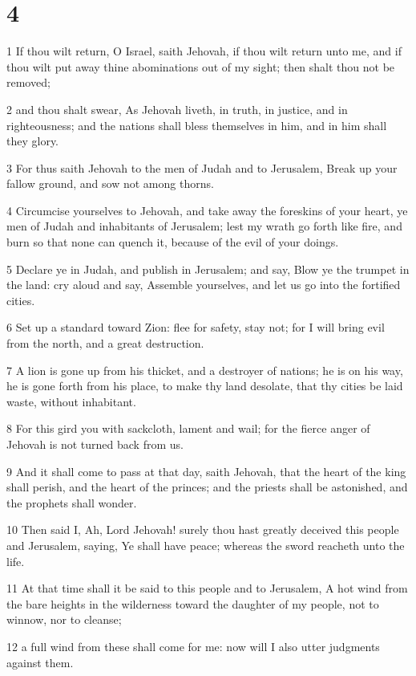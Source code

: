 \chapter{4}

\par 1 If thou wilt return, O Israel, saith Jehovah, if thou wilt return unto me, and if thou wilt put away thine abominations out of my sight; then shalt thou not be removed;
\par 2 and thou shalt swear, As Jehovah liveth, in truth, in justice, and in righteousness; and the nations shall bless themselves in him, and in him shall they glory.
\par 3 For thus saith Jehovah to the men of Judah and to Jerusalem, Break up your fallow ground, and sow not among thorns.
\par 4 Circumcise yourselves to Jehovah, and take away the foreskins of your heart, ye men of Judah and inhabitants of Jerusalem; lest my wrath go forth like fire, and burn so that none can quench it, because of the evil of your doings.
\par 5 Declare ye in Judah, and publish in Jerusalem; and say, Blow ye the trumpet in the land: cry aloud and say, Assemble yourselves, and let us go into the fortified cities.
\par 6 Set up a standard toward Zion: flee for safety, stay not; for I will bring evil from the north, and a great destruction.
\par 7 A lion is gone up from his thicket, and a destroyer of nations; he is on his way, he is gone forth from his place, to make thy land desolate, that thy cities be laid waste, without inhabitant.
\par 8 For this gird you with sackcloth, lament and wail; for the fierce anger of Jehovah is not turned back from us.
\par 9 And it shall come to pass at that day, saith Jehovah, that the heart of the king shall perish, and the heart of the princes; and the priests shall be astonished, and the prophets shall wonder.
\par 10 Then said I, Ah, Lord Jehovah! surely thou hast greatly deceived this people and Jerusalem, saying, Ye shall have peace; whereas the sword reacheth unto the life.
\par 11 At that time shall it be said to this people and to Jerusalem, A hot wind from the bare heights in the wilderness toward the daughter of my people, not to winnow, nor to cleanse;
\par 12 a full wind from these shall come for me: now will I also utter judgments against them.
